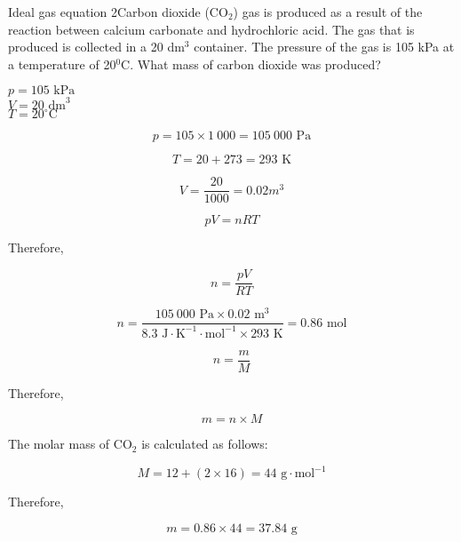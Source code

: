 \begin{wex}{Ideal gas equation 2}{Carbon dioxide (CO$_{2}$) gas is produced as a result of the reaction between calcium carbonate and hydrochloric acid. The gas that is produced is collected in a 20 dm$^{3}$ container. The pressure of the gas is 105 kPa at a temperature of 20$^{0}$C. What mass of carbon dioxide was produced?}{
$p = 105 \text{ kPa}$\\
$V = 20 \text{ dm}^{3}$\\
$T = 20^{\circ}\text{C}$\\


\begin{equation*}
p = 105 \times 1~000 = 105~000 \text{ Pa}
\end{equation*}

\begin{equation*}
T = 20 + 273 = 293 \text{ K}
\end{equation*}

\begin{equation*}
V = \frac{20}{1000} = 0.02 m^{3}
\end{equation*}

\begin{equation*}
pV = nRT
\end{equation*}

Therefore,

\begin{equation*}
n = \frac{pV}{RT}
\end{equation*}

\begin{equation*}
n = \frac{105~000 \text{ Pa} \times 0.02 \text{ m}^{3}}{8.3 \text{ J} \cdot \text{K}^{-1} \cdot \text{mol}^{-1} \times 293 \text{ K}} = 0.86 \text{ mol}
\end{equation*}

\begin{equation*}
n = \frac{m}{M}
\end{equation*}

Therefore,

\begin{equation*}
m = n \times M
\end{equation*}

The molar mass of CO$_{2}$ is calculated as follows:

\begin{equation*}
M = 12 + (2 \times 16) = 44 \text{ g} \cdot \text{mol}^{-1}
\end{equation*}

Therefore,

\begin{equation*}
m = 0.86 \times 44 = 37.84 \text{ g}
\end{equation*}
}

\end{wex}

